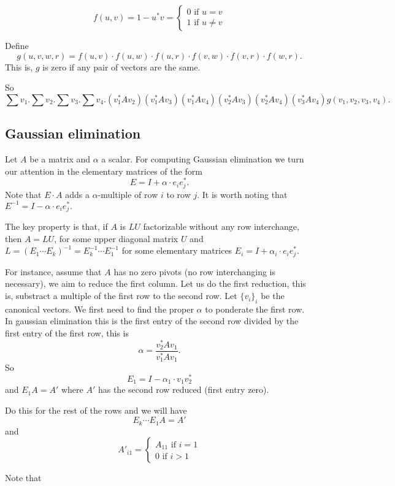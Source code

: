 \[
  			f(u,v)=1-u^*v=\begin{cases}
               0 \text{ if } u=v \\
               1 \text{ if } u\neq v
            \end{cases}
		\]

Define $$g(u,v,w,r)=f(u,v)\cdot f(u,w)\cdot f(u,r)\cdot f(v,w)\cdot f(v,r)\cdot f(w,r).$$ This is, $g$ is zero if any pair of vectors are the same.
		
So $$\sum v_1.\sum v_2. \sum v_3. \sum v_4. (v_1^*Av_2)(v_1^*Av_3)(v_1^*Av_4)(v_2^*Av_3)(v_2^*Av_4)(v_3^*Av_4)g(v_1,v_2,v_3,v_4).$$

\subsection*{Gaussian elimination}

Let $A$ be a matrix and $\alpha$ a scalar. For computing Gaussian elimination we turn our attention in the elementary matrices of the form $$E=I + \alpha\cdot e_ie_j^*.$$ Note that $E\cdot A$ adds a $\alpha$-multiple of row $i$ to row $j$. It is worth noting that $E^{-1}= I - \alpha\cdot e_ie_j^*.$

The key property is that, if $A$ is $LU$ factorizable without any row interchange, then $A=LU$, for some upper diagonal matrix $U$ and $L=(E_1\cdots E_k)^{-1}=E_k^{-1}\cdots E_1^{-1}$ for some elementary matrices $E_i=I + \alpha_i\cdot e_ie_j^*.$

For instance, assume that $A$ has no zero pivots (no row interchanging is necessary), we aim to reduce the first column. Let us do the first reduction, this is, substract a multiple of the first row to the second row. Let $\lbrace v_i\rbrace_i$ be the canonical vectors. We first need to find the proper $\alpha$ to ponderate the first row. In gaussian elimination this is the first entry of the second row divided by the first entry of the first row, this is $$\alpha = \dfrac{v_2^*Av_1}{v_1^*Av_1}.$$
So $$E_1= I - \alpha_1\cdot v_1v_2^*$$
and $E_1A=A'$ where $A'$ has the second row reduced (first entry zero).

Do this for the rest of the rows and we will have $$E_k\cdots E_1A=A'$$ and
\[
  			A'_{i1}=\begin{cases}
               A_{11} \text{ if } i =1 \\
               0 \text{ if } i > 1
            \end{cases}
		\]

Note that


